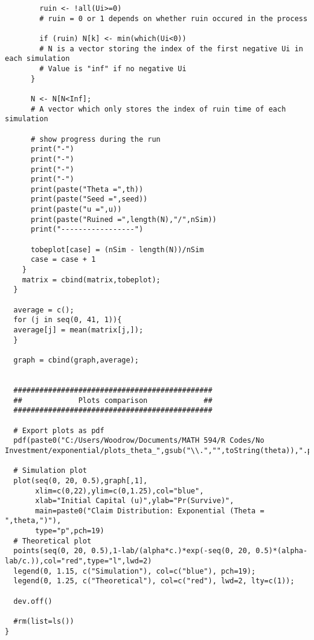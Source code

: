 \documentclass[12pt]{article}
\begin{document}
\begin{lstlisting}
        ruin <- !all(Ui>=0)
        # ruin = 0 or 1 depends on whether ruin occured in the process
        
        if (ruin) N[k] <- min(which(Ui<0))
        # N is a vector storing the index of the first negative Ui in each simulation
        # Value is "inf" if no negative Ui
      }
      
      N <- N[N<Inf]; 
      # A vector which only stores the index of ruin time of each simulation 
      
      # show progress during the run
      print("-")
      print("-")
      print("-")
      print("-")
      print(paste("Theta =",th))
      print(paste("Seed =",seed))
      print(paste("u =",u))
      print(paste("Ruined =",length(N),"/",nSim))
      print("-----------------")
      
      tobeplot[case] = (nSim - length(N))/nSim
      case = case + 1
    }
    matrix = cbind(matrix,tobeplot);
  }
  
  average = c();
  for (j in seq(0, 41, 1)){
  average[j] = mean(matrix[j,]);
  }
  
  graph = cbind(graph,average);
  
  
  ##############################################
  ##             Plots comparison             ##
  ##############################################
  
  # Export plots as pdf
  pdf(paste0("C:/Users/Woodrow/Documents/MATH 594/R Codes/No Investment/exponential/plots_theta_",gsub("\\.","",toString(theta)),".pdf"))
  
  # Simulation plot
  plot(seq(0, 20, 0.5),graph[,1],
       xlim=c(0,22),ylim=c(0,1.25),col="blue",
       xlab="Initial Capital (u)",ylab="Pr(Survive)",
       main=paste0("Claim Distribution: Exponential (Theta = ",theta,")"),
       type="p",pch=19)
  # Theoretical plot
  points(seq(0, 20, 0.5),1-lab/(alpha*c.)*exp(-seq(0, 20, 0.5)*(alpha-lab/c.)),col="red",type="l",lwd=2)
  legend(0, 1.15, c("Simulation"), col=c("blue"), pch=19);
  legend(0, 1.25, c("Theoretical"), col=c("red"), lwd=2, lty=c(1));
  
  dev.off()
  
  #rm(list=ls())
}
\end{lstlisting}
\end{document}
